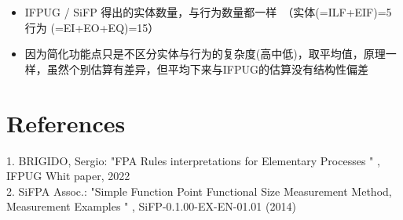 \begin{itemize}
\tightlist
\item
  IFPUG / SiFP
  得出的实体数量，与行为数量都一样　（实体(=ILF+EIF)=5　　行为
  (=EI+EO+EQ)=15）
\item
  因为简化功能点只是不区分实体与行为的复杂度(高中低)，取平均值，原理一样，虽然个别估算有差异，但平均下来与IFPUG的估算没有结构性偏差
\end{itemize}


\hypertarget{references}{%
\section{References}\label{references}}

1. BRIGIDO, Sergio: "FPA Rules interpretations for Elementary Processes " , IFPUG Whit paper, 2022\\
2. SiFPA Assoc.: "Simple Function Point Functional Size Measurement Method, Measurement Examples " , SiFP-0.1.00-EX-EN-01.01 (2014)\\

